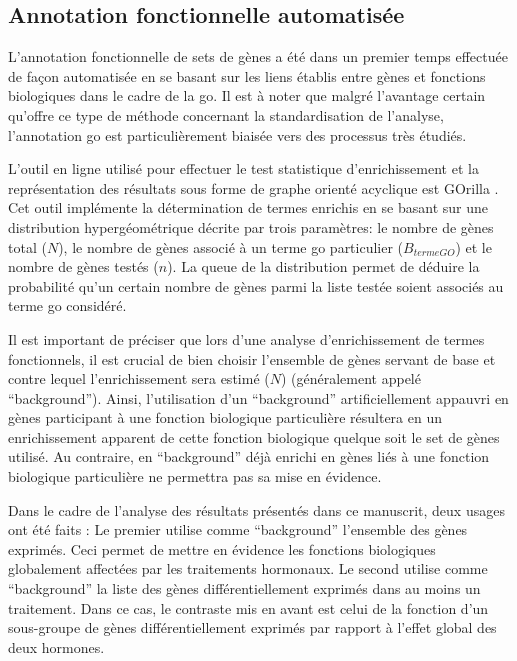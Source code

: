 \documentclass[../main.tex]{subfiles}
\begin{document}
\subsection{Annotation fonctionnelle automatisée}
L'annotation fonctionnelle de sets de gènes a été dans un premier temps effectuée de façon automatisée en se basant sur les liens établis entre gènes et fonctions biologiques dans le cadre de la \gls{go}.
Il est à noter que malgré l'avantage certain qu'offre ce type de méthode concernant la standardisation de l'analyse, l'annotation \gls{go} est particulièrement biaisée vers des processus très étudiés.
\par
L'outil en ligne utilisé pour effectuer le test statistique d'enrichissement et la représentation des résultats sous forme de graphe orienté acyclique est GOrilla \citep{Eden2009}.
Cet outil implémente la détermination de termes enrichis en se basant sur une distribution hypergéométrique décrite par trois paramètres:
le nombre de gènes total ($N$), le nombre de gènes associé à un terme \gls{go} particulier ($B_{terme GO}$) et le nombre de gènes testés ($n$).
La queue de la distribution permet de déduire la probabilité qu'un certain nombre de gènes parmi la liste testée soient associés au terme \gls{go} considéré.
\par
Il est important de préciser que lors d'une analyse d'enrichissement de termes fonctionnels, il est crucial de bien choisir l'ensemble de gènes servant de base et contre lequel l'enrichissement sera estimé ($N$) (généralement appelé ``background'').
Ainsi, l'utilisation d'un ``background'' artificiellement appauvri en gènes participant à une fonction biologique particulière résultera en un enrichissement apparent de cette fonction biologique quelque soit le set de gènes utilisé.
Au contraire, en ``background'' déjà enrichi en gènes liés à une fonction biologique particulière ne permettra pas sa mise en évidence.
\par
Dans le cadre de l'analyse des résultats présentés dans ce manuscrit, deux usages ont été faits :
Le premier utilise comme ``background'' l'ensemble des gènes exprimés.
Ceci permet de mettre en évidence les fonctions biologiques globalement affectées par les traitements hormonaux.
Le second utilise comme ``background'' la liste des gènes différentiellement exprimés dans au moins un traitement.
Dans ce cas, le contraste mis en avant est celui de la fonction d'un sous-groupe de gènes différentiellement exprimés par rapport à l'effet global des deux hormones.
\end{document}
